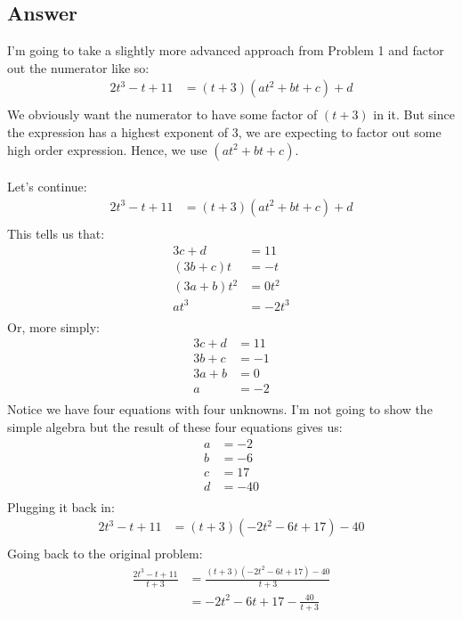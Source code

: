 \documentclass[12pt]{article}
\begin{document}
\subsection*{Answer}
I'm going to take a slightly more advanced approach from Problem 1 and factor out the numerator like so:
\begin{align*}
  2t^3-t+11 &= (t+3)(at^2 + bt + c)+d \\
\end{align*}
We obviously want the numerator to have some factor of $(t+3)$ in it. 
But since the expression has a highest exponent of 3, we are expecting to factor out some high order expression.
Hence, we use $(at^2 + bt + c)$.
\\ \\
Let's continue:
\begin{align*}
  2t^3-t+11 &= (t+3)(at^2 + bt + c)+d \\
\end{align*}
This tells us that:
\begin{align*}
  3c + d &= 11 \\
  (3b + c)t &= -t \\
  (3a + b)t^2 &= 0t^2 \\
  at^3 &= - 2t^3 \\
\end{align*}
Or, more simply:
\begin{align*}
  3c + d &= 11 \\
  3b + c &= -1 \\
  3a + b &= 0 \\
  a &= - 2 \\
\end{align*}
Notice we have four equations with four unknowns. I'm not going to show the simple algebra but the result of these four equations gives us:
\begin{align*}
  a &= -2 \\
  b &= -6 \\
  c &= 17 \\
  d &= -40 \\
\end{align*}
Plugging it back in:
\begin{align*}
  2t^3-t+11 &= (t+3)(-2t^2 - 6t + 17)-40 \\
\end{align*}
Going back to the original problem:
\begin{align*}
  \frac{2t^3-t+11}{t+3} &= \frac{(t+3)(-2t^2 - 6t + 17)-40}{t+3} \\
  &= -2t^2 - 6t + 17 - \frac{40}{t+3} \\
\end{align*}
\end{document}
